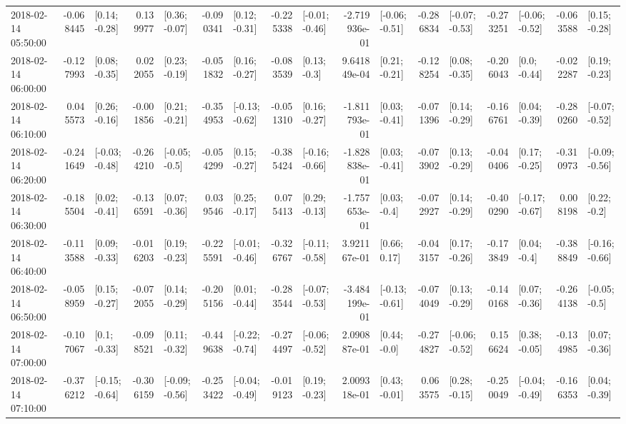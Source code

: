 \begin{tabular}{lrlrlrlrlrlrlrlrl}
2018-02-14 05:50:00 & -0.068445 &   [0.14; -0.28] &  0.139977 &   [0.36; -0.07] & -0.090341 &   [0.12; -0.31] & -0.225338 &  [-0.01; -0.46] & -2.719936e-01 &  [-0.06; -0.51] & -0.286834 &  [-0.07; -0.53] & -0.273251 &  [-0.06; -0.52] & -0.063588 &   [0.15; -0.28] \\
2018-02-14 06:00:00 & -0.127993 &   [0.08; -0.35] &  0.022055 &   [0.23; -0.19] & -0.051832 &   [0.16; -0.27] & -0.083539 &    [0.13; -0.3] &  9.641849e-04 &   [0.21; -0.21] & -0.128254 &   [0.08; -0.35] & -0.206043 &    [0.0; -0.44] & -0.022287 &   [0.19; -0.23] \\
2018-02-14 06:10:00 &  0.045573 &   [0.26; -0.16] & -0.001856 &   [0.21; -0.21] & -0.354953 &  [-0.13; -0.62] & -0.051310 &   [0.16; -0.27] & -1.811793e-01 &   [0.03; -0.41] & -0.071396 &   [0.14; -0.29] & -0.166761 &   [0.04; -0.39] & -0.280260 &  [-0.07; -0.52] \\
2018-02-14 06:20:00 & -0.241649 &  [-0.03; -0.48] & -0.264210 &   [-0.05; -0.5] & -0.054299 &   [0.15; -0.27] & -0.385424 &  [-0.16; -0.66] & -1.828838e-01 &   [0.03; -0.41] & -0.073902 &   [0.13; -0.29] & -0.040406 &   [0.17; -0.25] & -0.310973 &  [-0.09; -0.56] \\
2018-02-14 06:30:00 & -0.185504 &   [0.02; -0.41] & -0.136591 &   [0.07; -0.36] &  0.039546 &   [0.25; -0.17] &  0.075413 &   [0.29; -0.13] & -1.757653e-01 &    [0.03; -0.4] & -0.072927 &   [0.14; -0.29] & -0.400290 &  [-0.17; -0.67] &  0.008198 &    [0.22; -0.2] \\
2018-02-14 06:40:00 & -0.113588 &   [0.09; -0.33] & -0.016203 &   [0.19; -0.23] & -0.225591 &  [-0.01; -0.46] & -0.326767 &  [-0.11; -0.58] &  3.921167e-01 &    [0.66; 0.17] & -0.043157 &   [0.17; -0.26] & -0.173849 &    [0.04; -0.4] & -0.388849 &  [-0.16; -0.66] \\
2018-02-14 06:50:00 & -0.058959 &   [0.15; -0.27] & -0.072055 &   [0.14; -0.29] & -0.205156 &   [0.01; -0.44] & -0.283544 &  [-0.07; -0.53] & -3.484199e-01 &  [-0.13; -0.61] & -0.074049 &   [0.13; -0.29] & -0.140168 &   [0.07; -0.36] & -0.264138 &   [-0.05; -0.5] \\
2018-02-14 07:00:00 & -0.107067 &    [0.1; -0.33] & -0.098521 &   [0.11; -0.32] & -0.449638 &  [-0.22; -0.74] & -0.274497 &  [-0.06; -0.52] &  2.090887e-01 &    [0.44; -0.0] & -0.274827 &  [-0.06; -0.52] &  0.156624 &   [0.38; -0.05] & -0.134985 &   [0.07; -0.36] \\
2018-02-14 07:10:00 & -0.376212 &  [-0.15; -0.64] & -0.306159 &  [-0.09; -0.56] & -0.253422 &  [-0.04; -0.49] & -0.019123 &   [0.19; -0.23] &  2.009318e-01 &   [0.43; -0.01] &  0.063575 &   [0.28; -0.15] & -0.250049 &  [-0.04; -0.49] & -0.166353 &   [0.04; -0.39] \\

\end{tabular}
